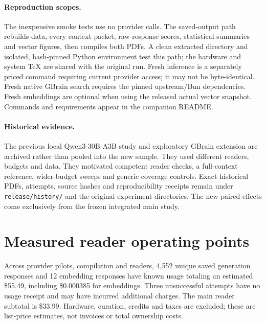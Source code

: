 \paragraph{Reproduction scopes.}
The inexpensive smoke tests use no provider calls. The saved-output path rebuilds data, every context packet, raw-response scores, statistical summaries and vector figures, then compiles both PDFs. A clean extracted directory and isolated, hash-pinned Python environment test this path; the hardware and system TeX are shared with the original run. Fresh inference is a separately priced command requiring current provider access; it may not be byte-identical. Fresh native GBrain search requires the pinned upstream/Bun dependencies. Fresh embeddings are optional when using the released actual vector snapshot. Commands and requirements appear in the companion README.

\paragraph{Historical evidence.}
The previous local Qwen3-30B-A3B study and exploratory GBrain extension are archived rather than pooled into the new sample. They used different readers, budgets and data. They motivated competent reader checks, a full-context reference, wider-budget sweeps and generic coverage controls. Exact historical PDFs, attempts, source hashes and reproducibility receipts remain under \texttt{release/history/} and the original experiment directories. The new paired effects come exclusively from the frozen integrated main study.

\section{Measured reader operating points}
Across provider pilots, compilation and readers, 4,552 unique saved generation responses and 12 embedding responses have known usage totaling an estimated \$55.49, including \$0.000385 for embeddings. Three unsuccessful attempts have no usage receipt and may have incurred additional charges. The main reader subtotal is \$33.99. Hardware, curation, credits and taxes are excluded; these are list-price estimates, not invoices or total ownership costs.
\begin{table}[ht]
\centering\footnotesize
\caption{Mean input/output tokens per request, realized usage-based price per 100 calls and mean response time in the main batch. Provider tokenizers/defaults differ. Cache behavior, bounded concurrency and the runtime interruption affect operating points; these are not service-level or production-TCO estimates. Source/embedding and compilation costs are reported separately.}
\label{tab:resources}
\end{table}
